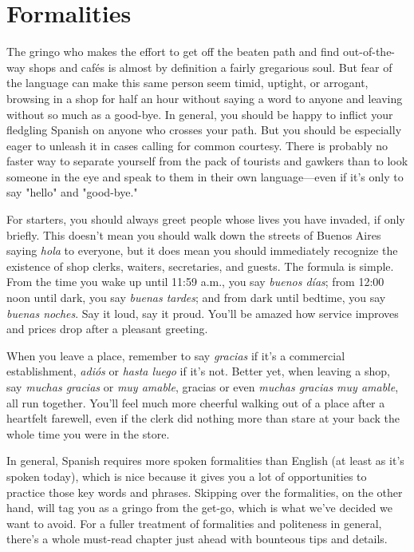 \documentclass[14pt,a4paper,oneside]{memoir}
\begin{document}
\section{Formalities}

The gringo who makes the effort to get off the beaten path and
find out-of-the-way shops and cafés is almost by definition a fairly gregarious soul. But fear of the language can make this same person seem
timid, uptight, or arrogant, browsing in a shop for half an hour without
saying a word to anyone and leaving without so much as a good-bye. In
general, you should be happy to inflict your fledgling Spanish on anyone who crosses your path. But you should be especially eager to unleash it in cases calling for common courtesy. There is probably no
faster way to separate yourself from the pack of tourists and gawkers
than to look someone in the eye and speak to them in their own language---even if it's only to say "hello" and "good-bye."

For starters, you should always greet people whose lives you
have invaded, if only briefly. This doesn't mean you should walk down
the streets of Buenos Aires saying \emph{hola} to everyone, but it does mean
you should immediately recognize the existence of shop clerks, waiters, secretaries, and guests. The formula is simple. From the time you
wake up until 11:59 a.m., you say \emph{buenos días}; from 12:00 noon until
dark, you say \emph{buenas tardes}; and from dark until bedtime, you say
\emph{buenas noches}. Say it loud, say it proud. You'll be amazed how service
improves and prices drop after a pleasant greeting.

When you leave a place, remember to say \emph{gracias} if it's a commercial establishment, \emph{adiós} or \emph{hasta luego} if it's not. Better yet,
when leaving a shop, say \emph{muchas gracias} or \emph{muy amable}, gracias or
even \emph{muchas gracias muy amable}, all run together. You'll feel much
more cheerful walking out of a place after a heartfelt farewell, even if
the clerk did nothing more than stare at your back the whole time you
were in the store.

In general, Spanish requires more spoken formalities than English (at least as it's spoken today), which is nice because it gives you a
lot of opportunities to practice those key words and phrases. Skipping
over the formalities, on the other hand, will tag you as a gringo from
the get-go, which is what we've decided we want to avoid. For a fuller
treatment of formalities and politeness in general, there's a whole
must-read chapter just ahead with bounteous tips and details.
\end{document}
